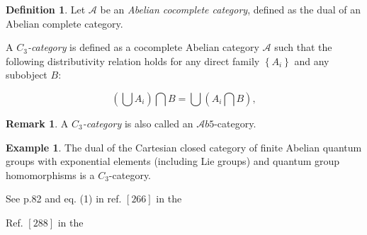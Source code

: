 \documentclass[12pt]{article}
\theoremstyle{plain}
\theoremstyle{definition}
\newtheorem{definition}{Definition}[section]
\newtheorem{example}{Example}[section]
\newtheorem{remark}{Remark}[section]
\numberwithin{equation}{section}
\begin{document}
\begin{definition}
Let $\mathcal{A}$ be an \emph{Abelian cocomplete category}, defined as the dual of an Abelian complete category.

A \emph{$C_3$-category} is defined as a cocomplete Abelian category $\mathcal{A}$ 
such that the following distributivity relation holds for any direct family $\left\{A_i\right\}$ and any subobject $B$:

$$(\bigcup A_i) \bigcap B = \bigcup (A_i \bigcap B),$$ \cite{BM266} 

\end{definition}

\begin{remark}
 
 A \emph{$C_3$-category} is also called an $\mathcal{A}b5$-category.

\end{remark}

\begin{example}
The dual of the Cartesian closed category of finite Abelian quantum groups with exponential
elements (including Lie groups) and quantum group homomorphisms is a $C_3$-category.  
\end{example}

\begin{thebibliography}{9}
See p.82 and eq. (1) in ref. $[266]$ in the

Ref. $[288]$ in the 

\end{thebibliography}

\end{document}

